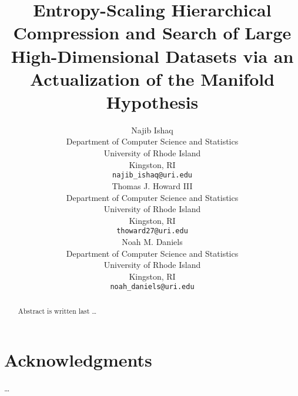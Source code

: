\documentclass{article}
\title{Entropy-Scaling Hierarchical Compression and Search of Large High-Dimensional Datasets via an Actualization of the Manifold Hypothesis}
\author{
    Najib Ishaq \\
    Department of Computer Science and Statistics\\
    University of Rhode Island \\
    Kingston, RI \\
    \texttt{najib\_ishaq@uri.edu} \\
    \And
    Thomas J. Howard III \\
    Department of Computer Science and Statistics\\
    University of Rhode Island\\
    Kingston, RI\\
    \texttt{thoward27@uri.edu} \\
    \AND
    Noah M. Daniels \\
    Department of Computer Science and Statistics\\
    University of Rhode Island\\
    Kingston, RI\\
    \texttt{noah\_daniels@uri.edu} \\
}
\date{}
\begin{document}
    \maketitle
    \begin{abstract}
        Abstract is written last \dots
    \end{abstract}

    
    
    
    
    
    

    \section*{Acknowledgments}

    \dots

    \FloatBarrier
      
    
\end{document}
